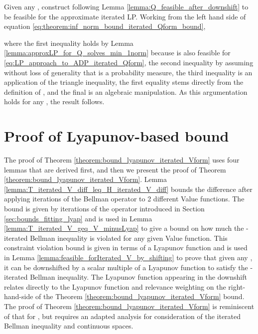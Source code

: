 \documentclass[journal]{IEEEtran}
\begin{document}
\vspace{0.2cm}



\begin{IEEEproof}
	
	Given any , construct  following Lemma \ref{lemma:Q_feasible_after_downshift} to be feasible for the approximate iterated LP.
Working from the left hand side of equation \eqref{eq:theorem:inf_norm_bound_iterated_Qform_bound},
	
	where the first inequality holds by Lemma \ref{lemma:approxLP_for_Q_solves_min_1norm} because  is also feasible for \eqref{eq:LP_approach_to_ADP_iterated_Qform}, the second inequality by assuming without loss of generality that  is a probability measure, the third inequality is an application of the triangle inequality, the first equality stems directly from the definition of , and the final is an algebraic manipulation.
As this argumentation holds for any ,  the result follows.
\end{IEEEproof}



 







\section{Proof of Lyapunov-based bound} \label{app:proof_bound_lyap_Vform}



The proof of Theorem \ref{theorem:bound_lyapunov_iterated_Vform} uses four lemmas that are derived first, and then we present the proof of Theorem \ref{theorem:bound_lyapunov_iterated_Vform}.
Lemma \ref{lemma:T_iterated_V_diff_leq_H_iterated_V_diff} bounds the difference after applying  iterations of the Bellman operator to 2 different Value functions. The bound is given by  iterations of the  operator introduced in Section \ref{sec:bounds_fitting_lyap} and is used in Lemma \ref{lemma:T_iterated_V_geq_V_minusLyap} to give a bound on how much the -iterated Bellman inequality is violated for any given Value function. This constraint violation bound is given in terms of a Lyapunov function and is used in Lemma \ref{lemma:feasible_forIterated_V_by_shifting} to prove that given any , it can be downshifted by a scalar multiple of a Lyapunov function to satisfy the -iterated Bellman inequality. The Lyapunov function appearing in the downshift relates directly to the Lyapunov function and relevance weighting on the right-hand-side of the Theorem \ref{theorem:bound_lyapunov_iterated_Vform} bound.
The proof of Theorem \ref{theorem:bound_lyapunov_iterated_Vform} is reminiscent of that for \cite[Theorem 3]{vanRoy_linApproxDP}, but requires an adapted analysis for consideration of the iterated Bellman inequality and continuous spaces.
\end{document}
